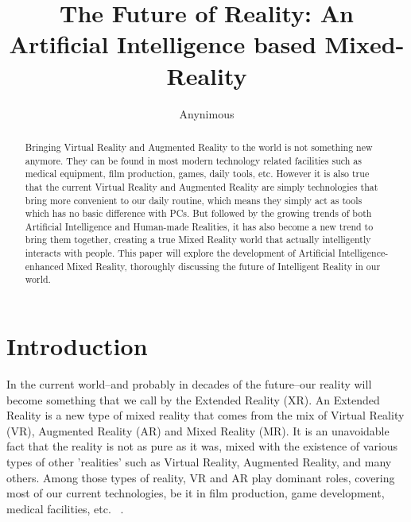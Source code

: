 \documentclass{llncs}
\begin{document}
	
\title{The Future of Reality: An Artificial Intelligence based Mixed-Reality}
\author{Anynimous}
\maketitle

\begin{abstract}
Bringing Virtual Reality and Augmented Reality to the world is not something new anymore. They can be found in most modern technology related facilities such as medical equipment, film production, games, daily tools, etc. However it is also true that the current Virtual Reality and Augmented Reality are simply technologies that bring more convenient to our daily routine, which means they simply act as tools which has no basic difference with PCs. But followed by the growing trends of both Artificial Intelligence and Human-made Realities, it has also become a new trend to bring them together, creating a true Mixed Reality world that actually intelligently interacts with people. This paper will explore the development of Artificial Intelligence-enhanced Mixed Reality, thoroughly discussing the future of Intelligent Reality in our world. 
\end{abstract}


\section{Introduction}


In the current world--and probably in decades of the future--our reality will become something that we call by the Extended Reality (XR). An Extended Reality is a new type of mixed reality that comes from the mix of Virtual Reality (VR), Augmented Reality (AR) and Mixed Reality (MR). It is an unavoidable fact that the reality is not as pure as it was, mixed with the existence of various types of other 'realities' such as Virtual Reality, Augmented Reality, and many others. Among those types of reality, VR and AR play dominant roles, covering most of our current technologies, be it in film production, game development, medical facilities, etc. ~\cite{li}. 
\end{document}
